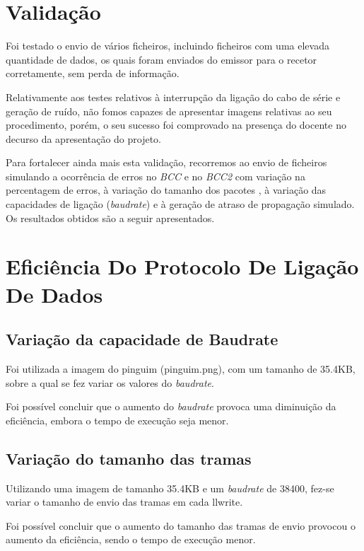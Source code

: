\documentclass{article}
\begin{document}
\section{Validação}

Foi testado o envio de vários ficheiros, incluindo ficheiros com uma elevada quantidade de dados, os quais foram enviados do emissor para o recetor corretamente, sem perda de informação.

Relativamente aos testes relativos à interrupção da ligação do cabo de série e geração de ruído, não fomos capazes de apresentar imagens relativas ao seu procedimento, porém, o seu sucesso foi comprovado na presença do docente no decurso da apresentação do projeto.

Para fortalecer ainda mais esta validação, recorremos ao envio de ficheiros simulando a ocorrência de erros no \textit{BCC} e no \textit{BCC2} com variação na percentagem de erros, à variação do tamanho dos pacotes , à variação das capacidades de ligação (\textit{baudrate}) e à geração de atraso de propagação simulado. Os resultados obtidos são a seguir apresentados.  


\section{Eficiência Do Protocolo De Ligação De Dados}

\subsection{Variação da capacidade de Baudrate}

Foi utilizada a imagem do pinguim (pinguim.png), com um tamanho de 35.4KB, sobre a qual se fez variar os valores do \textit{baudrate}.

Foi possível concluir que o aumento do \textit{baudrate} provoca uma diminuição da eficiência, embora o tempo de execução seja menor.

\subsection{Variação do tamanho das tramas}

Utilizando uma imagem de tamanho 35.4KB e um \textit{baudrate} de 38400, fez-se variar o tamanho de envio das tramas em cada llwrite.

Foi possível concluir que o aumento do tamanho das tramas de envio provocou o aumento da eficiência, sendo o tempo de execução menor.
\end{document}
